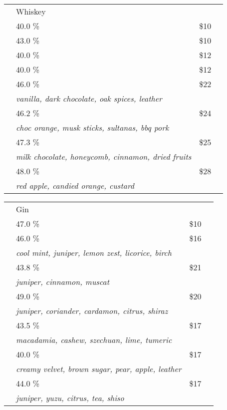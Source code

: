\documentclass[12pt]{article}
\makeatletter
\newcommand*\ColText[1]{\textcolor{SpringGreen4}{#1}}
\newcommand*\GroupGlassTitle[2]{%
  \noalign{\vspace{2em}}
  \fontfamily{qzc}\selectfont #2 & \vspace{1em}\fontsize{20}{29}\selectfont\ColText{#1}}
\newenvironment{Group}
  {\vspace{2em}\noindent\begin{tabular*}{\textwidth}{@{} p{10mm} l@{\extracolsep{\fill}} r@{\hspace{1em}} r@{}}} %
  {\end{tabular*}}
\newcommand*\Booze[3]{%
  \noalign{\vspace{1em}}
  \multicolumn{2}{l}{ #1 \tiny\dotfill } & \scriptsize #2 \% \tiny\dotfill & \normalsize \$#3}
\newcommand*\Expl[1]{%
  {} & \hspace*{0.1em} \scriptsize #1}
\newcommand*\Glass[2]{%
    \begin{tikzpicture}[remember picture,overlay]
        \node[xshift=5mm,yshift=0mm]{%
            \texttt{[image: Glasses/\#1.png]}
        };
    \end{tikzpicture}%
}
\newcommand*\GlassGlencairn{%
    \Glass{glencairn}{4mm}}
\newcommand*\GlassHighball{%
    \Glass{highball}{6mm}}
\makeatother
\begin{document}
\begin{Group}
    \GroupGlassTitle{Whiskey}{\GlassGlencairn} \\
    \Booze{Jameson Blended Irish Whiskey}{40.0}{10} \\
    \Booze{Grants Triple Wood Blended Scotch}{43.0}{10} \\
    \Booze{Starward Two-fold Double Grain}{40.0}{12} \\
    \Booze{Chivas Regal 12yo Blended Scotch}{40.0}{12} \\
    \Booze{anCnoc Highland Single Malt 13yo}{46.0}{22}\\
    \Expl{\it vanilla, dark chocolate, oak spices, leather} \\
    \Booze{Hellyers Road Pinot Noir Cask 16yo}{46.2}{24}\\
    \Expl{\it choc orange, musk sticks, sultanas, bbq pork} \\
    \Booze{Glenmorangie 12 YO Malaga Cask 17yo}{47.3}{25}\\
    \Expl{\it milk chocolate, honeycomb, cinnamon, dried fruits} \\
    \Booze{Ballantines Glenburgie Single Malt 17yo}{48.0}{28}\\
    \Expl{\it red apple, candied orange, custard} \\
\end{Group}
\vfill
\begin{center}
	
\end{center}
\pagebreak
\begin{Group}
    \GroupGlassTitle{Gin}{\GlassHighball} \\
    \Booze{Bombay Sapphire}{47.0}{10} \\
    \Booze{The Botanist}{46.0}{16}\\
    \Expl{\it cool mint, juniper, lemon zest, licorice, birch} \\
    \Booze{Four Pillars Christmas 2019}{43.8}{21}\\
    \Expl{\it juniper, cinnamon, muscat} \\
    \Booze{Giniversity Barrel Aged}{49.0}{20}\\
    \Expl{\it juniper, coriander, cardamon, citrus, shiraz} \\
    \Booze{Four Pillars Spice Trade Gin}{43.5}{17}\\
    \Expl{\it macadamia, cashew, szechuan, lime, tumeric} \\
    \Booze{Hartsthorn Sheep's Whey Gin}{40.0}{17}\\
    \Expl{\it creamy velvet, brown sugar, pear, apple, leather} \\
    \Booze{Reed \& Co Neo Dry Gin}{44.0}{17}\\
    \Expl{\it juniper, yuzu, citrus, tea, shiso} \\
\end{Group}
\vfill
\begin{center}
	
\end{center}
\pagebreak
\end{document}
